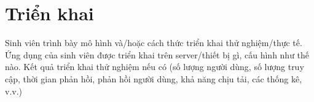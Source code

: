 \documentclass[../DoAn.tex]{subfiles}
\begin{document}
\section{Triển khai}
Sinh viên trình bày mô hình và/hoặc cách thức triển khai thử nghiệm/thực tế. Ứng dụng của sinh viên được triển khai trên server/thiết bị gì, cấu hình như thế nào. Kết quả triển khai thử nghiệm nếu có (số lượng người dùng, số lượng truy cập, thời gian phản hồi, phản hồi người dùng, khả năng chịu tải, các thống kê, v.v.)
\end{document}
